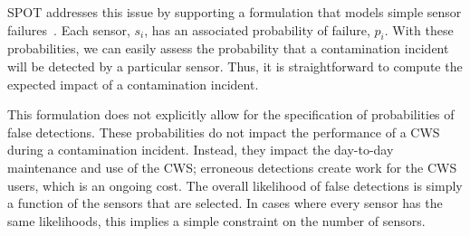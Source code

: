 SPOT addresses this issue by supporting a formulation that models simple sensor failures~\cite{BerryCHLPW09}. Each sensor, $s_i$, has an associated probability of failure, $p_i$. With these probabilities, we can easily assess the probability that a contamination incident will be detected by a particular sensor. Thus, it is straightforward to compute the expected impact of a contamination incident.

This formulation does not explicitly allow for the specification of probabilities of false detections. These probabilities do not impact the performance of a CWS during a contamination incident. Instead, they impact the day-\/to-\/day maintenance and use of the CWS; erroneous detections create work for the CWS users, which is an ongoing cost. The overall likelihood of false detections is simply a function of the sensors that are selected. In cases where every sensor has the same likelihoods, this implies a simple constraint on the number of sensors. 
